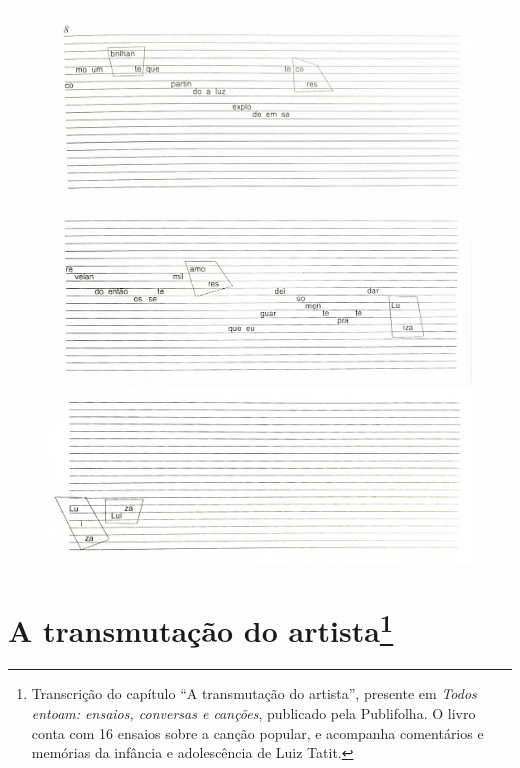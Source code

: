 \begin{figure}[H]
\includegraphics[width=\textwidth]{./imgs/figura32.jpg}

\includegraphics[width=\textwidth]{./imgs/figura33.jpg}

\includegraphics[width=\textwidth]{./imgs/figura34.jpg}
\end{figure}

\chapter{A transmutação do artista\footnote{Transcrição do capítulo ``A transmutação do artista'', presente em \textit{Todos entoam: ensaios, conversas e canções}, publicado pela Publifolha. O livro conta com 16 ensaios sobre a canção popular, e acompanha comentários e memórias da infância e adolescência de Luiz Tatit.}}


